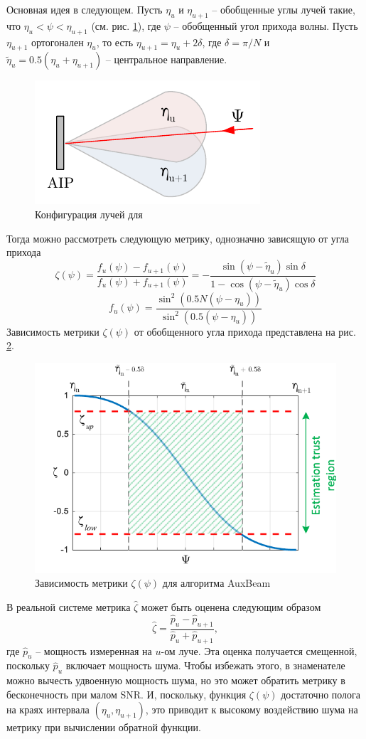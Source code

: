 Основная идея в следующем. Пусть $\eta_u$ и $\eta_{u+1}$ -- обобщенные углы
лучей такие, что $\eta_u<\psi<\eta_{u+1}$ (см. рис. \ref{fig:4.14}), где $\psi$
-- обобщенный угол прихода волны.  Пусть $\eta_{u+1}$ ортогонален $\eta_u$, то
есть $\eta_{u+1} = \eta_u + 2\delta$, где $\delta = \pi/N$  и $\tilde \eta_u =
0.5 (\eta_u + \eta_{u+1})$ -- центральное направление.
\begin{figure}[ht]
    \centering
    \includegraphics[width=0.5\linewidth]{figs/fig4.14}
    \caption{Конфигурация лучей для \AuxBeam{}}
    \label{fig:4.14}
\end{figure}
Тогда можно рассмотреть следующую метрику, однозначно зависящую от угла прихода
\begin{equation}
    \label{eq:4.37}
    \zeta(\psi) = \frac{f_u(\psi) - f_{u+1}(\psi)}{f_u(\psi) + f_{u+1}(\psi)} = - \frac{\sin(\psi - \tilde \eta_u) \sin \delta}{1 - \cos(\psi - \tilde \eta_u) \cos \delta}
\end{equation}
\begin{equation}
    \label{eq:4.38}
    f_u(\psi) = \frac{\sin^2 (0.5 N (\psi - \eta_u))}{\sin^2(0.5 (\psi - \eta_u))}
\end{equation}
Зависимость метрики $\zeta(\psi)$  от обобщенного угла прихода представлена на
рис. \ref{fig:4.15}.
\begin{figure}[ht]
    \centering
    \includegraphics[width=0.5\linewidth]{figs/fig4.15}
    \caption{Зависимость метрики $\zeta(\psi)$ для алгоритма AuxBeam}
    \label{fig:4.15}
\end{figure}
В реальной системе метрика $\hat \zeta$ может быть оценена следующим образом
\begin{equation}
    \label{eq:4.39}
    \hat \zeta = \frac{\hat p_u - \hat p_{u+1}}{ \hat p_u + \hat p_{u+1} },
\end{equation}
где $\hat p_u$ -- мощность измеренная на $u$-ом луче. Эта оценка получается смещенной, поскольку $\hat p_u$ включает мощность шума.
Чтобы избежать этого, в знаменателе можно вычесть удвоенную мощность шума, но это может обратить метрику в бесконечность при малом SNR.
И, поскольку, функция $\zeta(\psi)$ достаточно полога на краях интервала $(\eta_u, \eta_{u+1})$, это приводит к высокому
воздействию шума на метрику при вычислении обратной функции.

